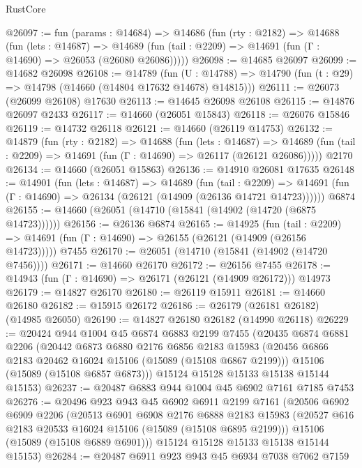 \begin{lexlean}{RustCore}
\begin{coremodule}
@26097 := fun (params : @14684) =>
  @14686
    (fun (rty : @2182) =>
    @14688
      (fun (lets : @14687) =>
      @14689 (fun (tail : @2209) => @14691 (fun (Γ : @14690) => @26053 (@26080 @26086)))))
@26098 := @14685 @26097
@26099 := @14682 @26098
@26108 := @14789
    (fun (U : @14788) => @14790 (fun (t : @29) => @14798 (@14660 (@14804 @17632 @14678) @14815)))
@26111 := @26073 (@26099 @26108) @17630
@26113 := @14645 @26098 @26108
@26115 := @14876 @26097 @2433
@26117 := @14660 (@26051 @15843)
@26118 := @26076 @15846
@26119 := @14732 @26118
@26121 := @14660 (@26119 @14753)
@26132 := @14879
    (fun (rty : @2182) =>
    @14688
      (fun (lets : @14687) =>
      @14689 (fun (tail : @2209) => @14691 (fun (Γ : @14690) => @26117 (@26121 @26086)))))
    @2170
@26134 := @14660 (@26051 @15863)
@26136 := @14910 @26081 @17635
@26148 := @14901
    (fun (lets : @14687) =>
    @14689
      (fun (tail : @2209) =>
      @14691 (fun (Γ : @14690) => @26134 (@26121 (@14909 (@26136 @14721 @14723))))))
    @6874
@26155 := @14660 (@26051 (@14710 (@15841 (@14902 (@14720 (@6875 @14723))))))
@26156 := @26136 @6874
@26165 := @14925
    (fun (tail : @2209) => @14691 (fun (Γ : @14690) => @26155 (@26121 (@14909 (@26156 @14723)))))
    @7455
@26170 := @26051 (@14710 (@15841 (@14902 (@14720 @7456))))
@26171 := @14660 @26170
@26172 := @26156 @7455
@26178 := @14943 (fun (Γ : @14690) => @26171 (@26121 (@14909 @26172))) @14973
@26179 := @14827 @26170
@26180 := @26119 @15911
@26181 := @14660 @26180
@26182 := @15915 @26172
@26186 := @26179 (@26181 @26182) (@14985 @26050)
@26190 := @14827 @26180 @26182 (@14990 @26118)
@26229 := @20424
    @944
    @1004
    @45
    @6874
    @6883
    @2199
    @7455
    (@20435
      @6874
      @6881
      @2206
      (@20442
        @6873
        @6880
        @2176
        @6856
        @2183
        @15983
        (@20456 @6866 @2183 @20462 @16024 @15106 (@15089 (@15108 @6867 @2199)))
        @15106
        (@15089 (@15108 @6857 @6873)))
      @15124
      @15128
      @15133
      @15138
      @15144
      @15153)
@26237 := @20487 @6883 @944 @1004 @45 @6902 @7161 @7185 @7453
@26276 := @20496
    @923
    @943
    @45
    @6902
    @6911
    @2199
    @7161
    (@20506
      @6902
      @6909
      @2206
      (@20513
        @6901
        @6908
        @2176
        @6888
        @2183
        @15983
        (@20527 @616 @2183 @20533 @16024 @15106 (@15089 (@15108 @6895 @2199)))
        @15106
        (@15089 (@15108 @6889 @6901)))
      @15124
      @15128
      @15133
      @15138
      @15144
      @15153)
@26284 := @20487 @6911 @923 @943 @45 @6934 @7038 @7062 @7159

\end{coremodule}
\end{lexlean}
